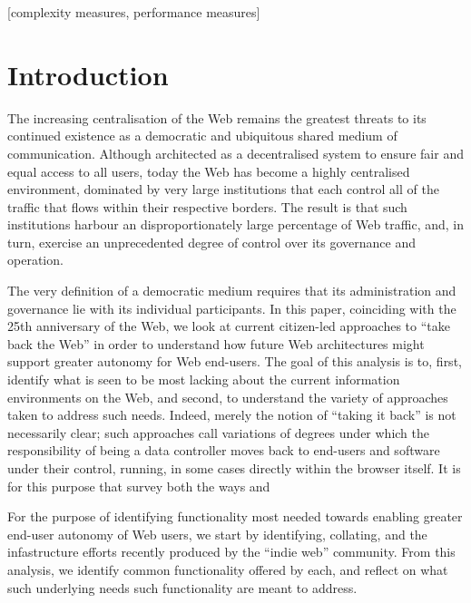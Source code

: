 \documentclass{article}
\begin{document}
{{%
[complexity measures, performance measures]



\section{Introduction}

The increasing centralisation of the Web remains the greatest threats to its continued existence as a democratic and ubiquitous shared medium of communication. Although architected as a decentralised system to ensure fair and equal access to all users, today the Web has become a highly centralised environment, dominated by very large institutions that each control all of the traffic that flows within their respective borders.  The result is that such institutions harbour an disproportionately large percentage of Web traffic, and, in turn, exercise an unprecedented degree of control over its governance and operation.

The very definition of a democratic medium requires that its administration and governance lie with its individual participants.  In this paper, coinciding with the 25th anniversary of the Web, we look at current citizen-led approaches to ``take back the Web'' in order to understand how future Web architectures might support greater autonomy for Web end-users.  The goal of this analysis is to, first, identify what is seen to be most lacking about the current information environments on the Web, and second, to understand the variety of approaches taken to address such needs.  Indeed, merely the notion of ``taking it back'' is not necessarily clear; such approaches call variations of degrees under which the responsibility of being a data controller moves back to end-users and software under their control, running, in some cases directly within the browser itself.  It is for this purpose that survey both the ways and 
	
For the purpose of identifying functionality most needed towards enabling greater end-user autonomy of Web users, we start by identifying, collating, and the infastructure efforts recently produced by the ``indie web'' community.  From this analysis, we identify common functionality offered by each, and reflect on what such underlying needs such functionality  are meant to address.

}}
\end{document}
